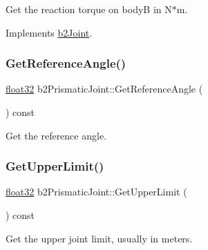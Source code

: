 Get the reaction torque on bodyB in N$\ast$m. 



Implements \mbox{\hyperlink{classb2_joint_ae355e441c2aa842777dc04e24f15ced0}{b2\+Joint}}.

\mbox{\label{classb2_prismatic_joint_a7b40d88d1bdb18089803d5abc6ba67c5}} 
\subsubsection{\texorpdfstring{GetReferenceAngle()}{GetReferenceAngle()}}
{\footnotesize\ttfamily \mbox{\hyperlink{b2_settings_8h_aacdc525d6f7bddb3ae95d5c311bd06a1}{float32}} b2\+Prismatic\+Joint\+::\+Get\+Reference\+Angle (\begin{DoxyParamCaption}{ }\end{DoxyParamCaption}) const\hspace{0.3cm}{\ttfamily [inline]}}



Get the reference angle. 

\mbox{\label{classb2_prismatic_joint_aabae1da55e500b9c77007de4d085ffda}} 
\subsubsection{\texorpdfstring{GetUpperLimit()}{GetUpperLimit()}}
{\footnotesize\ttfamily \mbox{\hyperlink{b2_settings_8h_aacdc525d6f7bddb3ae95d5c311bd06a1}{float32}} b2\+Prismatic\+Joint\+::\+Get\+Upper\+Limit (\begin{DoxyParamCaption}{ }\end{DoxyParamCaption}) const}



Get the upper joint limit, usually in meters. 

\mbox{\label{classb2_prismatic_joint_a840e9885d49bf621c46df79733df21dc}} 
